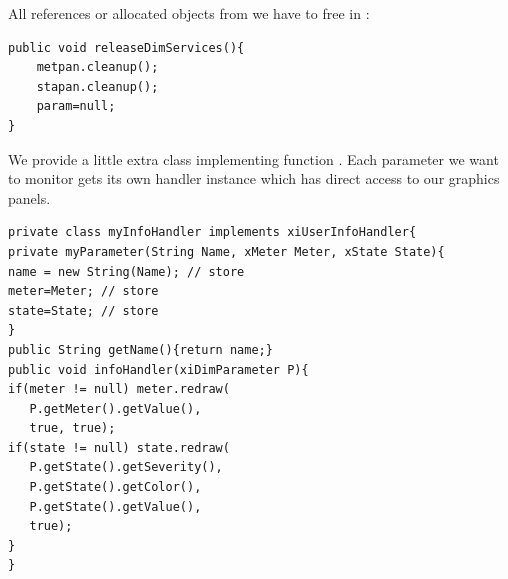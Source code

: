 All references or allocated objects from  we have to free in
:
{\small \begin{verbatim}
public void releaseDimServices(){
    metpan.cleanup();
    stapan.cleanup();
    param=null;
}
\end{verbatim}
}
We provide a little extra class implementing  function .
Each parameter we want to monitor gets its own handler instance which has direct
access to our graphics panels.
{\small \begin{verbatim}
private class myInfoHandler implements xiUserInfoHandler{
private myParameter(String Name, xMeter Meter, xState State){
name = new String(Name); // store
meter=Meter; // store
state=State; // store
}
public String getName(){return name;}
public void infoHandler(xiDimParameter P){
if(meter != null) meter.redraw(
   P.getMeter().getValue(),
   true, true);
if(state != null) state.redraw(
   P.getState().getSeverity(),
   P.getState().getColor(),
   P.getState().getValue(),
   true);
}
}
\end{verbatim}
}



